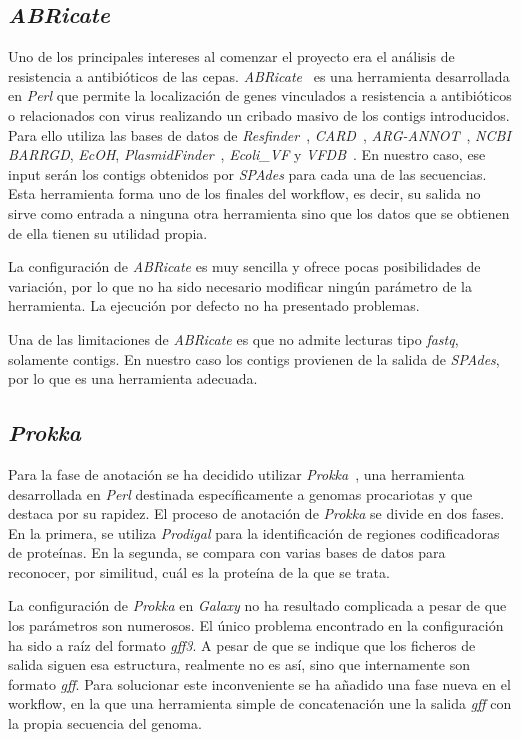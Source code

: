 \subsection{\itshape{ABRicate}}
Uno de los principales intereses al comenzar el proyecto era el análisis de resistencia a antibióticos de las cepas. \textit{ABRicate}~\cite{seemann_:mag_right:_2019} es una herramienta desarrollada en \textit{Perl} que permite la localización de genes vinculados a resistencia a antibióticos o relacionados con virus realizando un cribado masivo de los contigs introducidos. Para ello utiliza las bases de datos de \textit{Resfinder}~\cite{Resfinder}, \textit{CARD}~\cite{CARD}, \textit{ARG-ANNOT}~\cite{Gupta212}, \textit{NCBI} \textit{BARRGD}, \textit{EcOH}, \textit{PlasmidFinder}~\cite{Carattoli3895}, \textit{Ecoli\_VF} y \textit{VFDB}~\cite{VFDB}. En nuestro caso, ese input serán los contigs obtenidos por \textit{SPAdes} para cada una de las secuencias. Esta herramienta forma uno de los finales del workflow, es decir, su salida no sirve como entrada a ninguna otra herramienta sino que los datos que se obtienen de ella tienen su utilidad propia.

La configuración de \textit{ABRicate} es muy sencilla y ofrece pocas posibilidades de variación, por lo que no ha sido necesario modificar ningún parámetro de la herramienta. La ejecución por defecto no ha presentado problemas.

Una de las limitaciones de \textit{ABRicate} es que no admite lecturas tipo \textit{fastq}, solamente contigs. En nuestro caso los contigs provienen de la salida de \textit{SPAdes}, por lo que es una herramienta adecuada.

\subsection{\itshape{Prokka}}
Para la fase de anotación se ha decidido utilizar \textit{Prokka}~\cite{Seemann2014}, una herramienta desarrollada en \textit{Perl} destinada específicamente a genomas procariotas y que destaca por su rapidez. El proceso de anotación de \textit{Prokka} se divide en dos fases. En la primera, se utiliza \textit{Prodigal} para la identificación de regiones codificadoras de proteínas. En la segunda, se compara con varias bases de datos para reconocer, por similitud, cuál es la proteína de la que se trata.

La configuración de \textit{Prokka} en \textit{Galaxy} no ha resultado complicada a pesar de que los parámetros son numerosos. El único problema encontrado en la configuración ha sido a raíz del formato \textit{gff3}. A pesar de que se indique que los ficheros de salida siguen esa estructura, realmente no es así, sino que internamente son formato \textit{gff}. Para solucionar este inconveniente se ha añadido una fase nueva en el workflow, en la que una herramienta simple de concatenación une la salida \textit{gff} con la propia secuencia del genoma.

